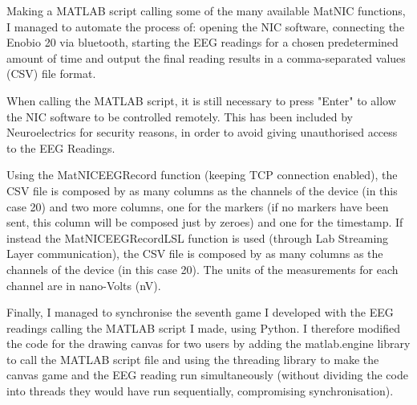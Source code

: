Making a MATLAB script calling some of the many available MatNIC functions, I managed to automate the process of: opening the NIC software, connecting the Enobio 20 via bluetooth, starting the EEG readings for a chosen predetermined amount of time and output the final reading results in a comma-separated values (CSV) file format. 

When calling the MATLAB script, it is still necessary to press "Enter" to allow the NIC software to be controlled remotely. This has been included by Neuroelectrics for security reasons, in order to avoid giving unauthorised access to the EEG Readings.




Using the MatNICEEGRecord function (keeping TCP connection enabled), the CSV file is composed by as many columns as the channels of the device (in this case 20) and two more columns, one for the markers (if no markers have been sent, this column will be composed just by zeroes) and one for the timestamp. If instead the MatNICEEGRecordLSL function is used (through Lab Streaming Layer communication), the CSV file is composed by as many columns as the channels of the device (in this case 20). The units of the measurements for each channel are in nano-Volts (nV). 

Finally, I managed to synchronise the seventh game I developed with the EEG readings calling the MATLAB script I made, using Python. I therefore modified the code for the drawing canvas for two users by adding the matlab.engine library to call the MATLAB script file and using the threading library to make the canvas game and the EEG reading run simultaneously (without dividing the code into threads they would have run sequentially, compromising synchronisation).

